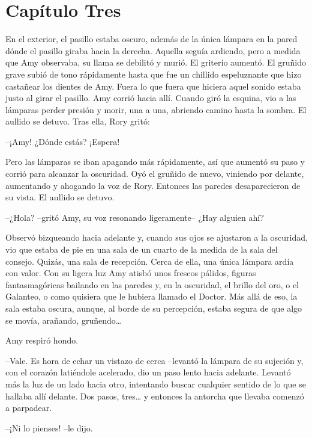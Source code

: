 \chapter*{Capítulo Tres}

{En el exterior, el pasillo estaba oscuro, además de la única lámpara en
	la pared dónde el pasillo giraba hacia la derecha. Aquella seguía
	ardiendo, pero a medida que Amy observaba, su llama se debilitó y murió.
	El griterío aumentó. El gruñido grave subió de tono rápidamente hasta
	que fue un chillido espeluznante que hizo castañear los dientes de Amy.
	Fuera lo que fuera que hiciera aquel sonido estaba justo al girar el
	pasillo. Amy corrió hacia allí. Cuando giró la esquina, vio a las
	lámparas perder presión y morir, una a una, abriendo camino hasta la
sombra. El aullido se detuvo. Tras ella, Rory gritó:}

{--¡Amy! ¿Dónde estás? ¡Espera!}

{Pero las lámparas se iban apagando más rápidamente, así que aumentó su
	paso y corrió para alcanzar la oscuridad. Oyó el gruñido de nuevo,
	viniendo por delante, aumentando y ahogando la voz de Rory. Entonces las
paredes desaparecieron de su vista. El aullido se detuvo.}

{--¿Hola? --gritó Amy, su voz resonando ligeramente-- ¿Hay alguien
ahí?}

{Observó bizqueando hacia adelante y, cuando sus ojos se ajustaron a la
	oscuridad, vio que estaba de pie en una sala de un cuarto de la medida
	de la sala del consejo. Quizás, una sala de recepción. Cerca de ella,
	una única lámpara ardía con valor. Con su ligera luz Amy atisbó unos
	frescos pálidos, figuras fantasmagóricas bailando en las paredes y, en
	la oscuridad, el brillo del oro, o el Galanteo, o como quisiera que le
	hubiera llamado el Doctor. Más allá de eso, la sala estaba oscura,
	aunque, al borde de su percepción, estaba segura de que algo se movía,
	arañando, gruñendo\ldots{}}

{Amy respiró hondo.}

{--Vale. Es hora de echar un vistazo de cerca --levantó la lámpara de
	su sujeción y, con el corazón latiéndole acelerado, dio un paso lento
	hacia adelante. Levantó más la luz de un lado hacia otro, intentando
	buscar cualquier sentido de lo que se hallaba allí delante. Dos pasos,
	tres\ldots{} y entonces la antorcha que llevaba comenzó a parpadear.}

{--¡Ni lo pienses! --le dijo.}

